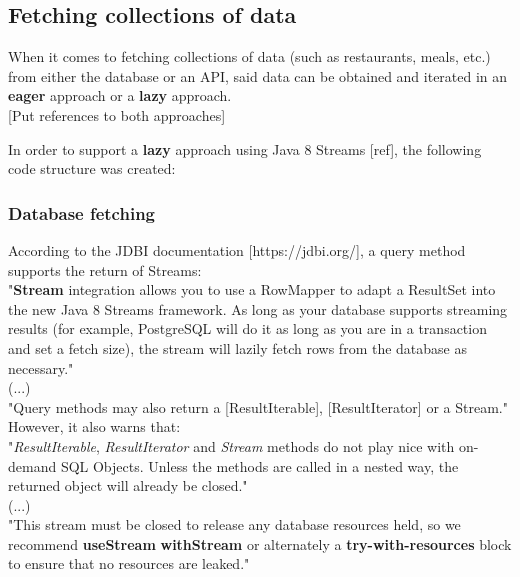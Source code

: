 \subsection{Fetching collections of data}
When it comes to fetching collections of data (such as restaurants, meals, etc.) from either the database or an API, said data can be obtained
and iterated in an \textbf{eager} approach or a \textbf{lazy} approach.\\

[Put references to both approaches]

In order to support a \textbf{lazy} approach using Java 8 Streams [ref], the following code structure was created:

\subsubsection{Database fetching}

According to the JDBI documentation [https://jdbi.org/], a query method supports the return of Streams:\\

"\textbf{Stream} integration allows you to use a RowMapper to adapt a ResultSet into the new Java 8 Streams framework.
As long as your database supports streaming results (for example, PostgreSQL will do it as long as you are in a transaction and set a fetch size),
the stream will lazily fetch rows from the database as necessary."\\

(...)\\

"Query methods may also return a [ResultIterable], [ResultIterator] or a Stream."\\

However, it also warns that:\\

"\textit{ResultIterable}, \textit{ResultIterator} and \textit{Stream} methods do not play nice with on-demand SQL Objects.
Unless the methods are called in a nested way, the returned object will already be closed."\\

(...)\\

"This stream must be closed to release any database resources held, so we recommend \textbf{useStream} \textbf{withStream}
or alternately a \textbf{try-with-resources} block to ensure that no resources are leaked."\\


